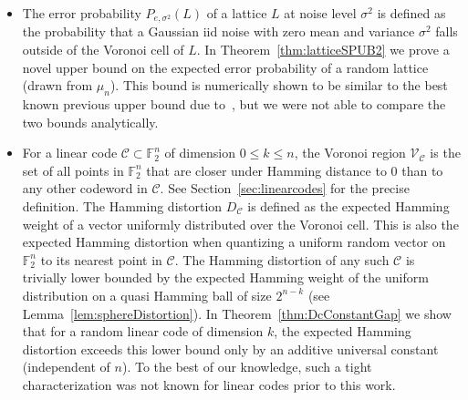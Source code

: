 \documentclass[article,doublecolumn]{IEEEtran}
\newcommand{\F}{{\mathbb{F}}}
\newcommand{\CC}{{\mathcal{C}}}
\begin{document}
\begin{itemize}
Furthermore, a canonical upper bound on the NSM of the ``best'' infinite constellation with a given point density was derived by Zador~\cite{zador1982asymptotic}. To date, it was not known whether or not this bound can be attained by lattices. In Theorem~\ref{thm:NSMzador} we show that for large $n$ there are lattices attaining Zador's upper bound (to within a $e^{-\Omega(n)}$ additive term). Furthermore, in Section~\ref{subsec:CSZador} we show that both Zador's upper bound for non-lattice quantizers and our new upper bound from Theorem~\ref{thm:NSMzador} for lattice quantizers approach Conway and Sloane's conjectured lower bound on the NSM  of any quantizer~\cite{conway1985lower} at rate $O\left( \frac{\log^2 n}{n^2}\right)$. 
This can be seen as an evidence that for large $n$ lattice quantizers are as good as any other quantizer, as was essentially postulated in Gersho's conjecture~\cite{gersho79}.
\item The error probability $P_{e,\sigma^2}(L)$ of a lattice $L$ at noise level $\sigma^2$ is defined as the probability that a Gaussian iid noise with zero mean and variance $\sigma^2$ falls outside of the Voronoi cell of $L$. In Theorem~\ref{thm:latticeSPUB2} we prove a novel upper bound on the expected error probability of a random lattice (drawn from $\mu_n$). This bound is numerically shown to be similar to the best known previous upper bound due to~\cite{poltyrev94AWGN,izf12}, but we were not able to compare the two bounds analytically.
\item For a linear code $\CC\subset \F_2^n$ of dimension $0\leq k\leq n$, the Voronoi region $\mathcal{V}_\CC$ is the set of all points in $\F_2^n$ that are closer under Hamming distance to $0$ than to any other codeword in $\CC$. See Section~\ref{sec:linearcodes} for the precise definition.
The Hamming distortion $D_\CC$ is defined as the expected Hamming weight of a vector uniformly distributed over the Voronoi cell. This is also the expected Hamming distortion when quantizing a uniform random vector on $\F_2^n$ to its nearest point in $\CC$. The Hamming distortion of any such $\CC$ is trivially lower bounded by the expected Hamming weight of the uniform distribution on a quasi Hamming ball of size $2^{n-k}$ (see Lemma~\ref{lem:sphereDistortion}). In Theorem~\ref{thm:DcConstantGap} we show that for a random linear code of dimension $k$, the expected Hamming distortion exceeds this lower bound only by an additive universal constant (independent of $n$). To the best of our knowledge, such a tight characterization was not known for linear codes prior to this work.

\end{itemize}
\end{document}
